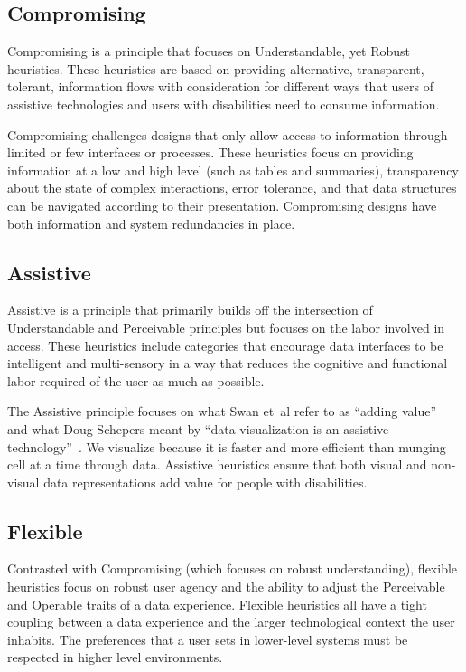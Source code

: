 \documentclass[12pt]{cmuthesis}
\newcommand{\ea}{{et~al\xperiod}\xspace}
\begin{document}
\subsection{Compromising}
Compromising is a principle that focuses on Understandable, yet Robust heuristics. These heuristics are based on providing alternative, transparent, tolerant, information flows with consideration for different ways that users of assistive technologies and users with disabilities need to consume information. 

Compromising challenges designs that only allow access to information through limited or few interfaces or processes. These heuristics focus on providing information at a low and high level (such as tables and summaries), transparency about the state of complex interactions, error tolerance, and that data structures can be navigated according to their presentation. Compromising designs have both information and system redundancies in place. 

\subsection{Assistive}
Assistive is a principle that primarily builds off the intersection of Understandable and Perceivable principles but focuses on the labor involved in access. These heuristics include categories that encourage data interfaces to be intelligent and multi-sensory in a way that reduces the cognitive and functional labor required of the user as much as possible. 

The Assistive principle focuses on what Swan \ea refer to as ``adding value''~\cite{SwanInclusive} and what Doug Schepers meant by ``data visualization is an assistive technology''~\cite{SchepersWhy}. We visualize because it is faster and more efficient than munging cell at a time through data. Assistive heuristics ensure that both visual and non-visual data representations add value for people with disabilities. 

\subsection{Flexible}
Contrasted with Compromising (which focuses on robust understanding), flexible heuristics focus on robust user agency and the ability to adjust the Perceivable and Operable traits of a data experience. Flexible heuristics all have a tight coupling between a data experience and the larger technological context the user inhabits. The preferences that a user sets in lower-level systems must be respected in higher level environments. 
\end{document}
